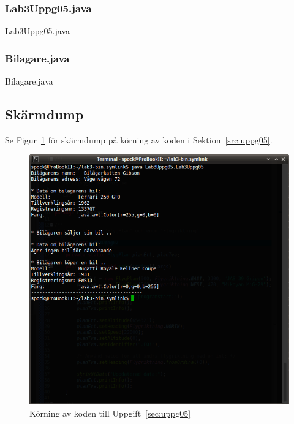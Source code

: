 \subsubsection{Lab3Uppg05.java}
\caption{Lab3Uppg05.java}
\label{src:uppg05}

\subsubsection{Bilagare.java}
\caption{Bilagare.java}
\label{src:bilagare}


\subsection{Skärmdump}
Se Figur~\ref{fig:uppg05-screenshot} för skärmdump på körning av koden i 
Sektion~\ref{src:uppg05}.

\begin{figure}[htbp]
    \centering
        \includegraphics[width=\linewidth]{img/05.png}
    \caption{Körning av koden till Uppgift~\ref{sec:uppg05}}
    \label{fig:uppg05-screenshot}
\end{figure}


